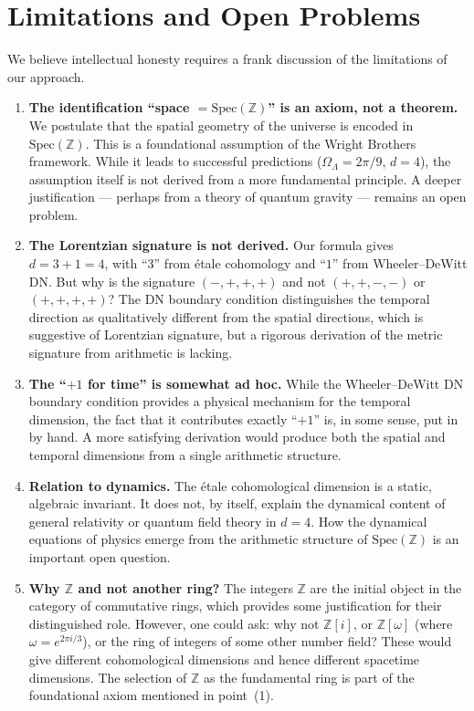 \documentclass[12pt,a4paper]{article}
\theoremstyle{definition}
\newcommand{\Spec}{\mathrm{Spec}}
\newcommand{\ZZ}{\mathbb{Z}}
\begin{document}
\section{Limitations and Open Problems}\label{sec:limitations}

We believe intellectual honesty requires a frank discussion of the limitations of
our approach.

\begin{enumerate}
  \item \textbf{The identification ``space $= \Spec(\ZZ)$'' is an axiom, not a theorem.}
    We postulate that the spatial geometry of the universe is encoded in $\Spec(\ZZ)$.
    This is a foundational assumption of the Wright Brothers framework. While it leads
    to successful predictions ($\Omega_\Lambda = 2\pi/9$, $d=4$), the assumption itself
    is not derived from a more fundamental principle. A deeper justification ---
    perhaps from a theory of quantum gravity --- remains an open problem.

  \item \textbf{The Lorentzian signature is not derived.}
    Our formula gives $d = 3 + 1 = 4$, with ``$3$'' from \'etale cohomology and
    ``$1$'' from Wheeler--DeWitt DN. But why is the signature $(-, +, +, +)$ and not
    $(+, +, -, -)$ or $(+, +, +, +)$? The DN boundary condition distinguishes the
    temporal direction as qualitatively different from the spatial directions, which is
    suggestive of Lorentzian signature, but a rigorous derivation of the metric
    signature from arithmetic is lacking.

  \item \textbf{The ``$+1$ for time'' is somewhat ad hoc.}
    While the Wheeler--DeWitt DN boundary condition provides a physical mechanism
    for the temporal dimension, the fact that it contributes exactly ``$+1$'' is,
    in some sense, put in by hand. A more satisfying derivation would produce both
    the spatial and temporal dimensions from a single arithmetic structure.

  \item \textbf{Relation to dynamics.}
    The \'etale cohomological dimension is a static, algebraic invariant. It does not,
    by itself, explain the dynamical content of general relativity or quantum field
    theory in $d=4$. How the dynamical equations of physics emerge from the arithmetic
    structure of $\Spec(\ZZ)$ is an important open question.

  \item \textbf{Why $\ZZ$ and not another ring?}
    The integers $\ZZ$ are the initial object in the category of commutative rings,
    which provides some justification for their distinguished role. However, one could
    ask: why not $\ZZ[i]$, or $\ZZ[\omega]$ (where $\omega = e^{2\pi i/3}$), or the
    ring of integers of some other number field? These would give different cohomological
    dimensions and hence different spacetime dimensions. The selection of $\ZZ$ as the
    fundamental ring is part of the foundational axiom mentioned in point~(1).
\end{enumerate}
\end{document}
